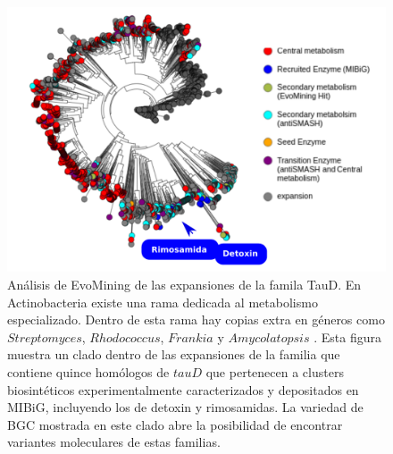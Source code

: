 \documentclass[12pt,twoside]{reedthesis}
\begin{document}
  \begin{figure}[h!tbp]
  \centering
  \includegraphics[angle = 0,scale = 0.68]{chapter2/tauD.pdf}
  \caption[Árbol de EvoMining de TauD en Actinobacteria muestra que esta enzima fue reclutada por una familia de BGCs ]{\footnotesize{Análisis de EvoMining de las expansiones de la famila TauD. En Actinobacteria existe una rama dedicada al metabolismo especializado. Dentro de esta rama hay copias extra en géneros como $Streptomyces$, $Rhodococcus$, $Frankia$ y $Amycolatopsis$ . Esta figura muestra un clado dentro de las expansiones de la familia que contiene quince  homólogos de $tauD$ que pertenecen a clusters biosintéticos experimentalmente caracterizados y depositados en MIBiG, incluyendo los de detoxin y rimosamidas. La variedad de BGC mostrada en este clado abre la posibilidad de encontrar variantes moleculares de estas familias.}}
  \label{fig:tauD}
  \end{figure}
  
\end{document}
